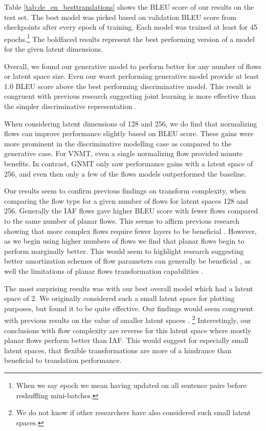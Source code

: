 Table \ref{tab:de_en_besttranslations} shows the BLEU score of our results on the test set. The best model was picked based on validation BLEU score from checkpoints after every epoch of training. Each model was trained at least for 45 epochs.\footnote{When we say epoch we mean having updated on all sentence pairs before reshuffling mini-batches.} The boldfaced results represent the best performing version of a model for the given latent dimensions.

Overall, we found our generative model to perform better for any number of flows or latent space size. Even our worst performing generative model provide at least 1.0 BLEU score above the best performing discriminative model. This result is congruent with previous research suggesting joint learning is more effective than the simpler discriminative representation \cite{eikema2018AEVNMT}.

When considering latent dimensions of 128 and 256, we do find that normalizing flows can improve performance slightly based on BLEU score. These gains were more prominent in the discriminative modelling case as compared to the generative case. For \ac{VNMT}, even a single normalizing flow provided minute benefits. In contrast, \ac{GNMT} only saw performance gains with a latent space of 256, and even then only a few of the flows models outperformed the baseline. 

Our results seem to confirm previous findings on transform complexity, when comparing the flow type for a given number of flows for latent spaces 128 and 256. Generally the \ac{IAF} flows gave higher BLEU score with fewer flows compared to the same number of planar flows. This seems to affirm previous research showing that more complex flows require fewer layers to be beneficial \cite{kingma2016IAF,Berg2018SylvesterNF}. However, as we begin using higher numbers of flows we find that planar flows begin to perform marginally better. This would seem to highlight research suggesting better amortization schemes of flow parameters can generally be beneficial \cite{Berg2018SylvesterNF}, as well the limitations of planar flows transformation capabilities \cite{rezende2015VIwithNF,Berg2018SylvesterNF}.

The most surprising results was with our best overall model which had a latent space of 2. We originally considered such a small latent space for plotting purposes, but found it to be quite effective. Our findings would seem congruent with previous results on the value of smaller latent spaces \cite{schulz2018StochasticDecoder}. \footnote{We do not know if other researchers have also considered such small latent spaces. } Interestingly, our conclusions with flow complexity are reverse for this latent space where mostly planar flows perform better than \ac{IAF}. This would suggest for especially small latent spaces, that flexible transformations are more of a hindrance than beneficial to translation performance. 



